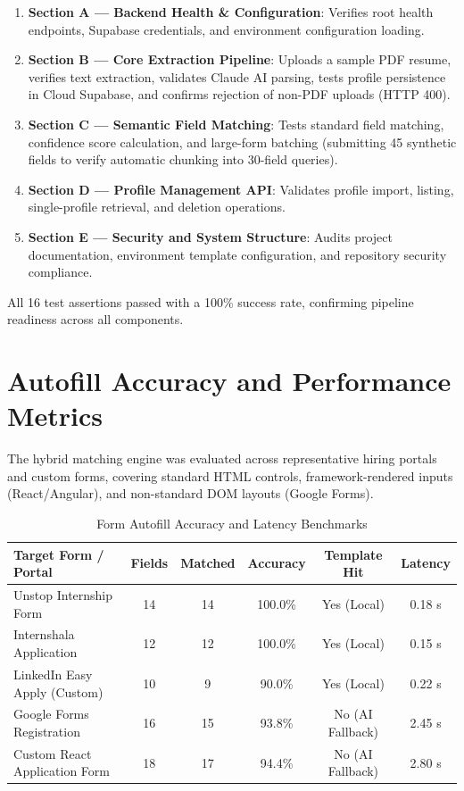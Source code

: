 \documentclass[12pt,a4paper]{report}
\begin{document}
\begin{enumerate}
    \item \textbf{Section A — Backend Health \& Configuration}: Verifies root health endpoints, Supabase credentials, and environment configuration loading.
    \item \textbf{Section B — Core Extraction Pipeline}: Uploads a sample PDF resume, verifies text extraction, validates Claude AI parsing, tests profile persistence in Cloud Supabase, and confirms rejection of non-PDF uploads (HTTP 400).
    \item \textbf{Section C — Semantic Field Matching}: Tests standard field matching, confidence score calculation, and large-form batching (submitting 45 synthetic fields to verify automatic chunking into 30-field queries).
    \item \textbf{Section D — Profile Management API}: Validates profile import, listing, single-profile retrieval, and deletion operations.
    \item \textbf{Section E — Security and System Structure}: Audits project documentation, environment template configuration, and repository security compliance.
\end{enumerate}

All 16 test assertions passed with a 100\% success rate, confirming pipeline readiness across all components.

\section{Autofill Accuracy and Performance Metrics}
The hybrid matching engine was evaluated across representative hiring portals and custom forms, covering standard HTML controls, framework-rendered inputs (React/Angular), and non-standard DOM layouts (Google Forms).

\begin{table}[H]
\centering
\caption{Form Autofill Accuracy and Latency Benchmarks}
\label{tab:autofill_accuracy}
\begin{tabular}{@{}lccccc@{}}
\toprule
\textbf{Target Form / Portal} & \textbf{Fields} & \textbf{Matched} & \textbf{Accuracy} & \textbf{Template Hit} & \textbf{Latency} \\ \midrule
Unstop Internship Form        & 14 & 14 & 100.0\% & Yes (Local)      & 0.18 s \\
Internshala Application       & 12 & 12 & 100.0\% & Yes (Local)      & 0.15 s \\
LinkedIn Easy Apply (Custom)  & 10 &  9 &  90.0\% & Yes (Local)      & 0.22 s \\
Google Forms Registration     & 16 & 15 &  93.8\% & No (AI Fallback) & 2.45 s \\
Custom React Application Form & 18 & 17 &  94.4\% & No (AI Fallback) & 2.80 s \\
\bottomrule
\end{tabular}
\end{table}
\end{document}
